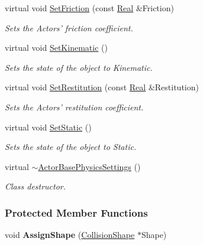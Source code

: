 \begin{DoxyCompactItemize}
virtual void \hyperlink{classMezzanine_1_1ActorBasePhysicsSettings_a615c423b6d2da96b16b91ee644b8b81c}{SetFriction} (const \hyperlink{namespaceMezzanine_a726731b1a7df72bf3583e4a97282c6f6}{Real} \&Friction)
\begin{DoxyCompactList}\small\item\em Sets the Actors' friction coefficient. \item\end{DoxyCompactList}\item 
virtual void \hyperlink{classMezzanine_1_1ActorBasePhysicsSettings_a3b01243f038e30eb39b04f8e38fb8a14}{SetKinematic} ()
\begin{DoxyCompactList}\small\item\em Sets the state of the object to Kinematic. \item\end{DoxyCompactList}\item 
virtual void \hyperlink{classMezzanine_1_1ActorBasePhysicsSettings_ac11357f16b6a30223d1794b4e4adf467}{SetRestitution} (const \hyperlink{namespaceMezzanine_a726731b1a7df72bf3583e4a97282c6f6}{Real} \&Restitution)
\begin{DoxyCompactList}\small\item\em Sets the Actors' restitution coefficient. \item\end{DoxyCompactList}\item 
virtual void \hyperlink{classMezzanine_1_1ActorBasePhysicsSettings_ac72f39fa6bc9e2f050fdf90e42dd0deb}{SetStatic} ()
\begin{DoxyCompactList}\small\item\em Sets the state of the object to Static. \item\end{DoxyCompactList}\item 
\hypertarget{classMezzanine_1_1ActorBasePhysicsSettings_a6273131ed9e51182abde28d5af4ded83}{
virtual \hyperlink{classMezzanine_1_1ActorBasePhysicsSettings_a6273131ed9e51182abde28d5af4ded83}{$\sim$ActorBasePhysicsSettings} ()}
\label{classMezzanine_1_1ActorBasePhysicsSettings_a6273131ed9e51182abde28d5af4ded83}

\begin{DoxyCompactList}\small\item\em Class destructor. \item\end{DoxyCompactList}\end{DoxyCompactItemize}
\subsubsection*{Protected Member Functions}
\begin{DoxyCompactItemize}
\item 
\hypertarget{classMezzanine_1_1ActorBasePhysicsSettings_a2deb9db4baf307a34f11a147e265378a}{
void {\bfseries AssignShape} (\hyperlink{classMezzanine_1_1CollisionShape}{CollisionShape} $\ast$Shape)}
\label{classMezzanine_1_1ActorBasePhysicsSettings_a2deb9db4baf307a34f11a147e265378a}

\end{DoxyCompactItemize}
